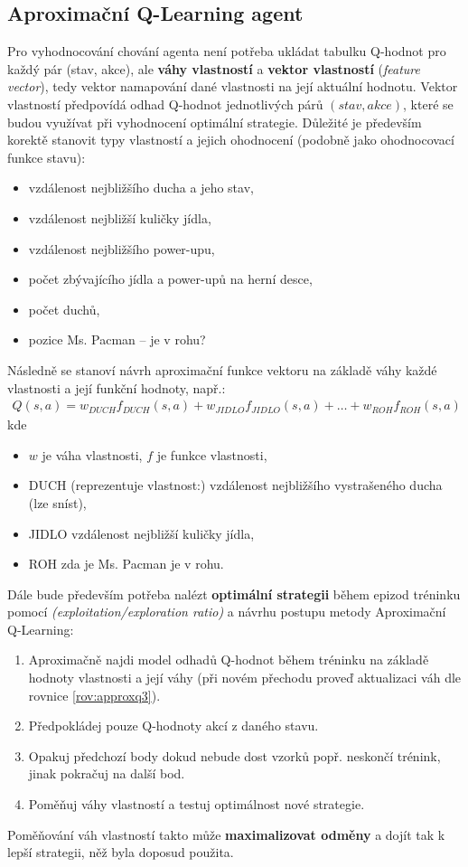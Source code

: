 \subsection*{Aproximační Q-Learning agent}
\label{navrh:approxqlearnagent}
Pro vyhodnocování chování agenta není potřeba ukládat tabulku Q-hodnot pro každý pár (stav, akce), ale \textbf{váhy vlastností} a \textbf{vektor vlastností} (\textit{feature vector}), tedy vektor namapování dané vlastnosti na její aktuální hodnotu.
Vektor vlastností předpovídá odhad Q-hodnot jednotlivých párů $(stav,akce)$, které se budou využívat při vyhodnocení optimální strategie. Důležité je především korektě stanovit typy vlastností a jejich ohodnocení (podobně jako ohodnocovací funkce stavu):
\begin{itemize}
\item vzdálenost nejbližšího ducha a jeho stav,
\item vzdálenost nejbližší kuličky jídla,
\item vzdálenost nejbližšího power-upu,
\item počet zbývajícího jídla a power-upů na herní desce,
\item počet duchů,
\item pozice Ms. Pacman -- je v rohu?
\end{itemize}
Následně se stanoví návrh aproximační funkce vektoru na základě váhy každé vlastnosti a její funkční hodnoty, např.:
\begin{align}
Q(s,a) = w_{DUCH}f_{DUCH}(s,a) + w_{JIDLO}f_{JIDLO}(s,a) + \dots + w_{ROH}f_{ROH}(s,a)
\end{align}
kde 
\begin{itemize}
  \item $w$ je váha vlastnosti, $f$ je funkce vlastnosti,
  \item DUCH (reprezentuje vlastnost:) vzdálenost nejbližšího vystrašeného ducha (lze sníst),
  \item JIDLO vzdálenost nejbližší kuličky jídla,
  \item ROH zda je Ms. Pacman je v rohu.
\end{itemize}

Dále bude především potřeba nalézt \textbf{optimální strategii} během epizod tréninku pomocí \textit{(exploitation/exploration ratio)} a návrhu postupu metody Aproximační Q-Learning:
\begin{enumerate}
\item Aproximačně najdi model odhadů Q-hodnot během tréninku na základě hodnoty vlastnosti a její váhy (při novém přechodu proveď aktualizaci váh dle rovnice \ref{rov:approxq3}).
\item Předpokládej pouze Q-hodnoty akcí z daného stavu.
\item Opakuj předchozí body dokud nebude dost vzorků popř. neskončí trénink, jinak pokračuj na další bod.
\item Poměňuj váhy vlastností a testuj optimálnost nové strategie.
\end{enumerate}
Poměňování váh vlastností takto může \textbf{maximalizovat odměny} a dojít tak k lepší strategii, něž byla doposud použita.

